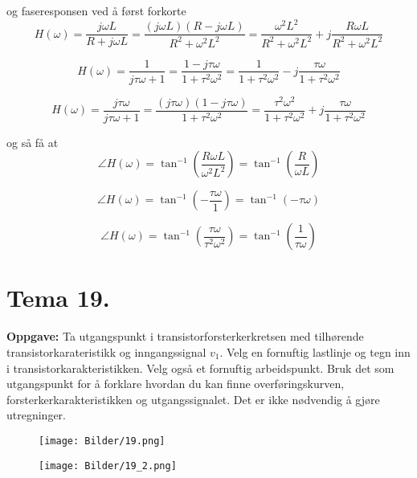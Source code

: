 \documentclass[a4paper,11pt,norsk]{article}
\begin{document}
\setcounter{equation}{0} 
og faseresponsen ved å først forkorte
\begin{equation}
    H(\omega) = \frac{j\omega L}{R + j\omega L} = \frac{(j\omega L)(R - j\omega L)}{R^2 + \omega^2L^2} = \frac{\omega^2L^2}{R^2+\omega^2L^2} + j\frac{R\omega L}{R^2 + \omega^2L^2}
\end{equation}

\begin{equation}
    H(\omega) = \frac{1}{j\tau\omega + 1} = \frac{1-j\tau\omega}{1 + \tau^2\omega^2} = \frac{1}{1 + \tau^2\omega^2} - j\frac{\tau\omega}{1 + \tau^2\omega^2} 
\end{equation}

\begin{equation}
    H(\omega) = \frac{j\tau\omega}{j\tau\omega + 1} = \frac{(j\tau\omega)(1-j\tau\omega)}{1 + \tau^2\omega^2} = \frac{\tau^2\omega^2}{1 + \tau^2\omega^2} + j\frac{\tau\omega}{1 + \tau^2\omega^2} 
\end{equation}

\setcounter{equation}{0} 
og så få at 
\begin{equation}
    \angle H(\omega) = \tan^{-1}{\left(\frac{R \omega L}{\omega^2L^2}\right)} = \tan^{-1}{\left(\frac{R}{\omega L}\right)}
\end{equation}

\begin{equation}
    \angle H(\omega) = \tan^{-1}{\left(-\frac{\tau\omega}{1}\right)} = \tan^{-1}{(-\tau\omega)}
\end{equation}

\begin{equation}
    \angle H(\omega) = \tan^{-1}{\left(\frac{\tau\omega}{\tau^2\omega^2}\right)} = \tan^{-1}{\left(\frac{1}{\tau\omega}\right)}
\end{equation}

\newpage
\section{Tema 19.}
\begin{question}
    \textbf{Oppgave:}
        Ta utgangspunkt i transistorforsterkerkretsen med tilhørende transistorkarateristikk og
        inngangssignal $v_1$. 
        Velg en fornuftig lastlinje og tegn inn i transistorkarakteristikken. Velg også et fornuftig
        arbeidspunkt. Bruk det som utgangspunkt for å forklare hvordan du kan finne
        overføringskurven, forsterkerkarakteristikken og utgangssignalet.
        Det er ikke nødvendig å gjøre utregninger.

        \begin{figure}[H]
            \centering 
            \begin{minipage}{0.45\textwidth}
                \texttt{[image: Bilder/19.png]}
            \end{minipage}
            \begin{minipage}{0.45\textwidth}
                \texttt{[image: Bilder/19\_2.png]}
            \end{minipage}
        \end{figure}
\end{question}
\end{document}
